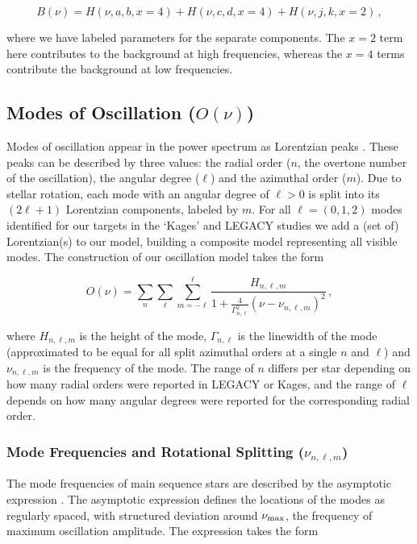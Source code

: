 \documentclass[12pt]{article}
\newcommand{\numax}{\mbox{$\nu_{\rm max}$}\xspace}
\begin{document}
\begin{equation}\label{eq:background}
	B(\nu) = H(\nu, a, b, x=4) + H(\nu, c, d, x=4) + H(\nu, j, k, x=2)\, ,
\end{equation}

\noindent where we have labeled parameters for the separate components. The $x = 2$ term here contributes to the background at high frequencies, whereas the $x=4$ terms contribute the background at low frequencies.

\subsection{Modes of Oscillation ($O(\nu)$)}
Modes of oscillation appear in the power spectrum as Lorentzian peaks \cite{chaplin+basu2017}. These peaks can be described by three values: the radial order ($n$, the overtone number of the oscillation), the angular degree ($\ell$) and the azimuthal order ($m$). Due to stellar rotation, each mode with an angular degree of $\ell > 0$ is split into its $(2\ell +1)$ Lorentzian components, labeled by $m$. For all $\ell=(0,1,2)$ modes identified for our targets in the  `Kages'  and LEGACY studies \cite{davies+2016,lund+2017} we add a (set of) Lorentzian(s) to our model, building a composite model representing all visible modes. The construction of our oscillation model takes the form

\begin{equation}
	O(\nu) = \sum_n \sum_\ell \sum_{m=-\ell}^\ell \frac{H_{n,\ell,m}}{1 + \frac{4}{\Gamma^2_{n,\ell}}(\nu - \nu_{n,\ell,m})^2}\, ,
\end{equation}

\noindent where $H_{n,\ell,m}$ is the height of the mode, $\Gamma_{n,\ell}$ is the linewidth of the mode (approximated to be equal for all split azimuthal orders at a single $n$ and $\ell$) and $\nu_{n, \ell, m}$ is the frequency of the mode. The range of $n$ differs per star depending on how many radial orders were reported in LEGACY or Kages, and the range of $\ell$ depends on how many angular degrees were reported for the corresponding radial order.

\subsubsection{Mode Frequencies and Rotational Splitting ($\nu_{n,\ell,m}$)}\label{ssec:frequencies}
The mode frequencies of main sequence stars are described by the asymptotic expression \cite{tassoul1980, vrard+2016}. The asymptotic expression defines the locations of the modes as regularly spaced, with structured deviation around \numax, the frequency of maximum oscillation amplitude. The expression takes the form
\end{document}
